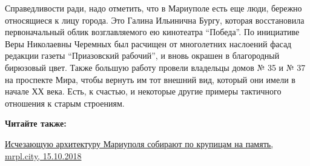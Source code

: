 Справедливости ради, надо отметить, что в Мариуполе есть еще люди, бережно
относящиеся к лицу города. Это Галина Ильинична Бургу, которая восстановила
первоначальный облик возглавляемого ею кинотеатра \enquote{Победа}. По инициативе Веры
Николаевны Черемных был расчищен от многолетних наслоений фасад редакции газеты
\enquote{Приазовский рабочий}, и вновь окрашен в благородный бирюзовый цвет. Также
большую работу провели владельцы домов № 35 и № 37 на проспекте Мира, чтобы
вернуть им тот внешний вид, который они имели в начале ХХ века. Есть, к
счастью, и некоторые другие примеры тактичного отношения к старым строениям.

\textbf{Читайте также:} 

\href{https://mrpl.city/news/view/ischezayushhuyu-arhitekturu-mariupolya-sobirayut-po-krupitsam-na-pamyatfoto-plusvideo}{%
Исчезающую архитектуру Мариуполя собирают по крупицам на память, mrpl.city, 15.10.2018}
